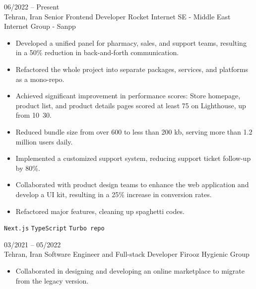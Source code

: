 \documentclass[8pt]{developercv} %
\begin{document}
    \vspace{-10 pt}
    \begin{entrylist}
        \entry
        {06/2022 -- Present \\ Tehran, Iran}
        {Senior Frontend Developer}
        {ًRocket Internet SE - Middle East Internet Group - Sanpp}
        {\vspace{-10pt}
            \begin{itemize}[noitemsep,topsep=0pt,parsep=0pt,partopsep=0pt, leftmargin=-1pt]
                \item Developed a unified panel for pharmacy, sales, and support teams, resulting in a 50\% reduction in back-and-forth communication.
                \item Refactored the whole project into separate packages, services, and platforms as a mono-repo.
                \item Achieved significant improvement in performance scores: Store homepage, product list, and product details pages scored at least 75 on Lighthouse, up from 10~30.
                \item Reduced bundle size from over 600 to less than 200 kb, serving more than 1.2 million users daily.
                \item Implemented a customized support system, reducing support ticket follow-up by 80\%.
                \item Collaborated with product design teams to enhance the web application and develop a UI kit, resulting in a 25\% increase in conversion rates.
                \item Refactored major features, cleaning up spaghetti codes.
            \end{itemize}
            \texttt{Next.js} \slashsep \texttt{TypeScript} \slashsep \texttt{Turbo repo}
        }
        \entry
        {03/2021 -- 05/2022 \\ Tehran, Iran}
        {Software Engineer {\small and} Full-stack Developer}
        {Firooz Hygienic Group}
        {\vspace{-10pt}
            \begin{itemize}[noitemsep,topsep=0pt,parsep=0pt,partopsep=0pt, leftmargin=-1pt]
                \item Collaborated in designing and developing an online marketplace to migrate from the legacy version.

\end{itemize}}
\end{entrylist}
\end{document}
